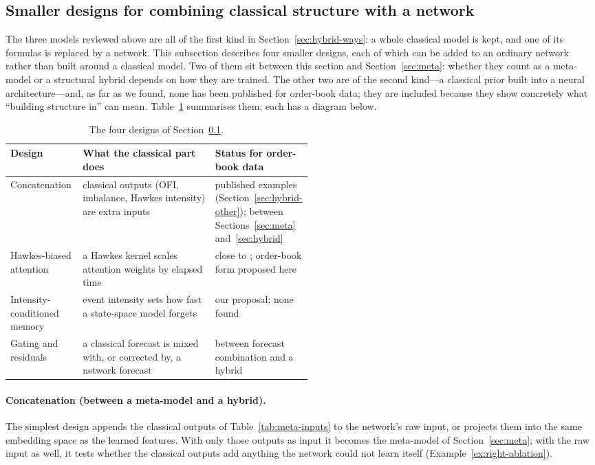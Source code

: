 \subsection{Smaller designs for combining classical structure with a network}
\label{sec:hybrid-patterns}

The three models reviewed above are all of the first kind in Section~\ref{sec:hybrid-ways}: a whole classical
model is kept, and one of its formulas is replaced by a network. This subsection describes four smaller
designs, each of which can be added to an ordinary network rather than built around a classical model.
Two of them sit between this section and Section~\ref{sec:meta}: whether they count as a meta-model or a
structural hybrid depends on how they are trained. The other two are of the second kind---a classical prior
built into a neural architecture---and, as far as we found, none has been published for order-book data;
they are included because they show concretely what ``building structure in'' can mean.
Table~\ref{tab:hybrid-patterns} summarises them; each has a diagram below.

\begin{table}[!htbp]
\centering\footnotesize
\caption{The four designs of Section~\ref{sec:hybrid-patterns}.}
\label{tab:hybrid-patterns}
\begin{tabularx}{\linewidth}{>{\raggedright\arraybackslash}p{0.24\linewidth}>{\raggedright\arraybackslash}X>{\raggedright\arraybackslash}p{0.27\linewidth}}
\toprule
Design & What the classical part does & Status for order-book data \\
\midrule
Concatenation & classical outputs (OFI, imbalance, Hawkes intensity) are extra inputs & published examples (Section~\ref{sec:hybrid-other}); between Sections~\ref{sec:meta} and~\ref{sec:hybrid} \\
Hawkes-biased attention & a Hawkes kernel scales attention weights by elapsed time & close to \citet{hwang2025shockbiased}; order-book form proposed here \\
Intensity-conditioned memory & event intensity sets how fast a state-space model forgets & our proposal; none found \\
Gating and residuals & a classical forecast is mixed with, or corrected by, a network forecast & between forecast combination and a hybrid \\
\bottomrule
\end{tabularx}
\end{table}


\paragraph{Concatenation (between a meta-model and a hybrid).} The simplest design appends the classical outputs of
Table~\ref{tab:meta-inputs} to the network's raw input, or projects them into the same embedding space as the
learned features. With only those outputs as input it becomes the meta-model of Section~\ref{sec:meta}; with
the raw input as well, it tests whether the classical outputs add anything the network could not learn
itself (Example~\ref{ex:right-ablation}).

